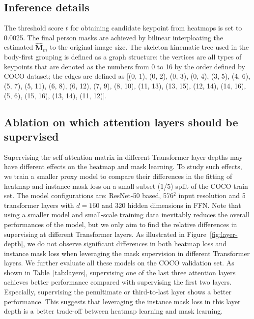 \documentclass{article} \usepackage{iclr_conference,times}
\begin{document}
\subsection{Inference details} 
The threshold score $t$ for obtaining candidate keypoint from heatmaps is set to 0.0025. The final person masks are achieved by bilinear interploating the estimated $\hat{\mathbf{M}}_m$ to the original image size. The skeleton kinematic tree used in the body-first grouping is defined as a graph structure: the vertices are all types of keypoints that are denoted as the numbers from 0 to 16 by the order defined by COCO dataset; the edges are defined as
    [(0, 1),
        (0, 2),
        (0, 3),
        (0, 4),
        (3, 5),
        (4, 6),
        (5, 7),
        (5, 11),
        (6, 8),
        (6, 12),
        (7, 9),
        (8, 10),
        (11, 13),
        (13, 15),
        (12, 14),
        (14, 16),
        (5, 6),  
        (15, 16),  
        (13, 14),  
        (11, 12)].





\subsection{Ablation on which attention layers should be supervised}
Supervising the self-attention matrix in different Transformer layer depths may have different effects on the heatmap and mask learning. To study such effects, we train a smaller proxy model to compare their differences in the fitting of heatmap and instance mask loss on a small subset (1/5) split of the COCO train set. The model configurations are: ResNet-50 based, 576$^2$ input resolution and 5 transformer layers with $d=160$ and 320 hidden dimensions in FFN. 
Note that using a smaller model and small-scale training data inevitably reduces the overall performances of the model, but we only aim to find the relative differences in supervising at different Transformer layers. 
As illustrated in Figure~\ref{fig:layer-depth}, we do not observe significant differences in both heatmap loss and instance mask loss when leveraging the mask supervision in different Transformer layers. We further evaluate all these models on the COCO validation set. As shown in Table~\ref{tab:layers}, supervising one of the last three attention layers achieves better performance compared with supervising the first two layers. Especially, supervising the penultimate or third-to-last layer shows a better performance. This suggests that leveraging the instance mask loss in this layer depth is a better trade-off between heatmap learning and mask learning.
\end{document}
